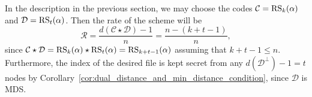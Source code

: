 \documentclass[../main.tex]{subfiles}
\begin{document}
In the description in the previous section, we may choose the codes $\mathcal{C} = \operatorname{RS}_k(\alpha)$ and $\mathcal{D} = \operatorname{RS}_t(\alpha)$. Then the rate of the scheme will be
\begin{equation*}
    \mathcal{R} = \frac{d(\mathcal{C} \star \mathcal{D}) - 1}{n} = \frac{n - (k + t - 1)}{n},
\end{equation*}
since $\mathcal{C} \star \mathcal{D} = \operatorname{RS}_k(\alpha) \star \operatorname{RS}_t(\alpha) = \operatorname{RS}_{k + t - 1}(\alpha)$ assuming that $k + t - 1 \leq n$. Furthermore, the index of the desired file is kept secret from any $d(\mathcal{D}^\perp) - 1 = t$ nodes by Corollary~\ref{cor:dual_distance_and_min_distance_condition}, since $\mathcal{D}$ is MDS.
\end{document}
